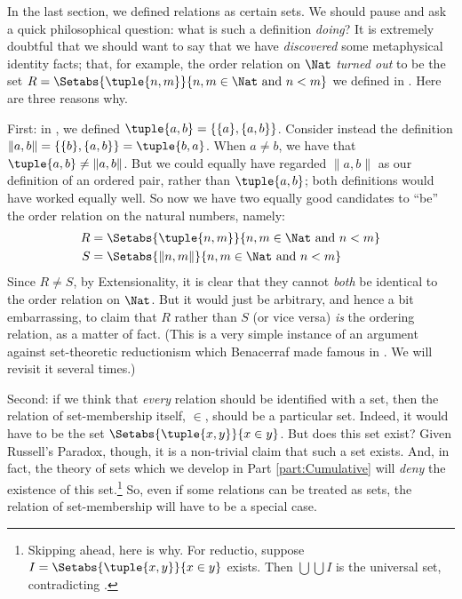 \documentclass[../../../include/open-logic-section]{subfiles}
\begin{document}

In the last section, we defined relations as certain sets. We should pause and ask a quick philosophical question: what is such a definition \emph{doing}? It is extremely doubtful that we should want to say that we have \emph{discovered} some metaphysical identity facts; that, for example, the order relation on $\Nat$ \emph{turned out} to be the set $R=  \Setabs{\tuple{n,m}}{n, m \in \Nat\text{ and } n < m}$ we defined in . Here are three reasons why. 

First: in , we defined $\tuple{a, b} = \{\{a\}, \{a, b\}\}$. Consider instead the definition $\lVert a, b\rVert = \{\{b\}, \{a, b\}\} = \tuple{b,a}$. When $a \neq b$, we have that $\tuple{a, b} \neq \lVert a,b\rVert$. But we could equally have regarded $\lVert a,b\rVert$ as our definition of an ordered pair, rather than $\tuple{a,b}$; both definitions would have worked equally well. So now we have two equally good candidates to ``be'' the order relation on the natural numbers, namely:
\begin{align*}
		R &= \Setabs{\tuple{n,m}}{n, m \in \Nat \text{ and }n < m}\\
		S &=  \Setabs{\lVert n,m\rVert}{n, m \in \Nat \text{ and }n < m}
\end{align*}
Since $R \neq S$, by Extensionality, it is clear that they cannot \emph{both} be identical to the order relation on $\Nat$. But it would just be arbitrary, and hence a bit embarrassing, to claim that $R$ rather than $S$ (or vice versa) \emph{is} the ordering relation, as a matter of fact. (This is a very simple instance of an argument against set-theoretic reductionism which Benacerraf made famous in \citeyear{Benacerraf1965}. We will revisit it several times.)

Second: if we think that \emph{every} relation should be identified with a set, then the relation of set-membership itself, $\in$, should be a particular set. Indeed, it would have to be the set $\Setabs{\tuple{x,y}}{x \in y}$. But does this set exist? Given Russell's Paradox, though, it is a non-trivial claim that such a set exists. And, in fact, the theory of sets which we develop in Part \ref{part:Cumulative} will \emph{deny} the existence of this set.\footnote{Skipping ahead, here is why. For reductio, suppose $I = \Setabs{\tuple{x,y}}{x \in y}$ exists. Then $\bigcup \bigcup I$ is the universal set, contradicting .} So, even if some relations can be treated as sets, the relation of set-membership will have to be a special case.
\end{document}
